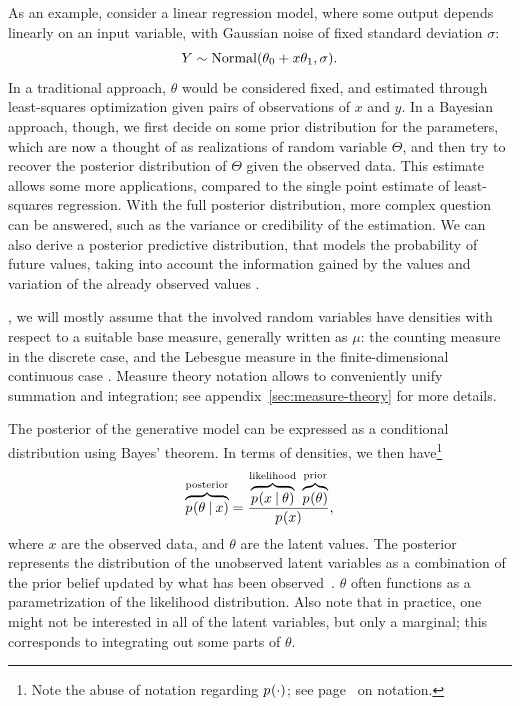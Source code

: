 As an example, consider a linear regression model, where some output depends linearly on an input
variable, with Gaussian noise of fixed standard deviation \(\sigma\):
\begin{equation}
  \label{eq:bayes-regression-model}
  Y \sim \mathrm{Normal}(\theta_0 + x\theta_1, \sigma). 
\end{equation}
In a traditional approach, \(\theta\) would be considered fixed, and estimated through least-squares
optimization given pairs of observations of \(x\) and \(y\).  In a Bayesian approach, though, we
first decide on some prior distribution for the parameters, which are now a thought of as
realizations of random variable \(\Theta\), and then try to recover the posterior distribution of
\(\Theta\) given the observed data.  This estimate allows some more applications, compared to the
single point estimate of least-squares regression.  With the full posterior distribution, more
complex question can be answered, such as the variance or credibility of the estimation.  We can
also derive a posterior predictive distribution, that models the probability of future values,
taking into account the information gained by the values and variation of the already observed
values \parencite{marin2007bayesian}.

, we will mostly assume that the involved random variables have
densities with respect to a suitable base measure, generally written as \(\mu\): the counting
measure in the discrete case, and the Lebesgue measure in the finite-dimensional continuous case
\parencite{kallenberg2006foundations}.  Measure theory notation allows to conveniently unify
summation and integration; see appendix~\ref{sec:measure-theory} for more details.

The posterior of the generative model can be expressed as a conditional distribution using Bayes'
theorem. In terms of densities, we then have\footnote{Note the abuse of notation regarding
  \(\prob{\cdot}\); see page~\pageref{cha:notation} on notation.}
\begin{equation}
  \label{eq:bayes}
  \overbrace{\prob{\theta \given x}}^{\text{posterior}} =
  \frac{\overbrace{\prob{x \given \theta}}^{\text{likelihood}}\;
    \overbrace{\prob{\theta}}^{\text{prior}}}{\prob{x}},
\end{equation}
where \(x\) are the observed data, and \(\theta\) are the latent values. The posterior represents
the distribution of the unobserved latent variables as a combination of the prior belief updated by
what has been observed~\parencite{congdon2006bayesian}.  \(\theta\) often functions as a
parametrization of the likelihood distribution.  Also note that in practice, one might not be
interested in all of the latent variables, but only a marginal; this corresponds to integrating out
some parts of \(\theta\).

